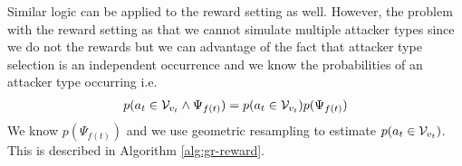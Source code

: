 Similar logic can be applied to the reward setting as well. However, the problem with the reward setting as that we cannot simulate multiple attacker types since we do not the rewards but we can advantage of the fact that attacker type selection is an independent occurrence and we know the probabilities of an attacker type occurring i.e.
\begin{align*}
    p(a_t \in \cal V_{v_t} \land \Psi_{f(t)}) = p(a_t \in \cal V_{v_t}) p(\Psi_{f(t)}) 
\end{align*}
We know $p(\Psi_{f(t)})$ and we use geometric resampling to estimate $p(a_t \in \cal V_{v_t})$. This is described in Algorithm \ref{alg:gr-reward}.